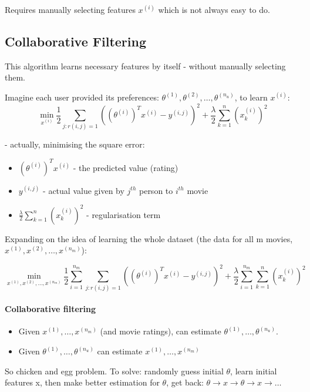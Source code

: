 \documentclass{scrartcl}
\begin{document}
Requires manually selecting features $x^{(i)}$ which is not always
easy to do.

\subsection{Collaborative Filtering}
\label{sec:16-3}

This algorithm learns necessary features by itself - without manually
selecting them.

Imagine each user provided its preferences: $\theta^{(1)},
\theta^{(2)}, \dots, \theta^{(n_u)}$, to learn $x^{(i)}$:
\[ \min \limits_{x^{(i)}} \frac{1}{2} \sum \limits_{j:r(i, j) = 1}
((\theta^{(i)})^T x^{(i)} - y^{(i,j)})^2 + \frac{\lambda}{2} \sum
\limits_{k=1}^n (x_k^{(i)})^2 \]

- actually, minimising the square error:
\begin{itemize}
\item $(\theta^{(i)})^T x^{(i)}$ - the predicted value (rating)
\item $y^{(i,j)}$ - actual value given by $j^{th}$ person to $i^{th}$
  movie
\item $\frac{\lambda}{2} \sum \limits_{k=1}^n (x_k^{(i)})^2$ -
  regularisation term
\end{itemize}

Expanding on the idea of learning the whole dataset (the data for all
m movies, $x^{(1)},x^{(2)}, \dots, x^{(n_m)}$):

\[ \min \limits_{x^{(1)},x^{(2)}, \dots, x^{(n_m)}} \frac{1}{2} \sum
\limits_{i=1}^{n_m} \sum \limits_{j:r(i, j) = 1} ((\theta^{(i)})^T
x^{(i)} - y^{(i,j)})^2 + \frac{\lambda}{2} \sum \limits_{i=1}^{n_m}
\sum \limits_{k=1}^n (x_k^{(i)})^2 \]

\paragraph{Collaborative filtering}
\begin{itemize}
\item Given $x^{(1)}, \dots, x^{(n_m)}$ (and movie ratings), can
  estimate $\theta^{(1)}, \dots, \theta^{(n_u)}$.
\item Given $\theta^{(1)}, \dots, \theta^{(n_u)}$ can estimate
  $x^{(1)}, \dots, x^{(n_m)}$
\end{itemize}

So chicken and egg problem. To solve: randomly guess initial $\theta$,
learn initial features x, then make better estimation for $\theta$,
get back: $\theta \to x \to \theta \to x \to \dots$
\end{document}
